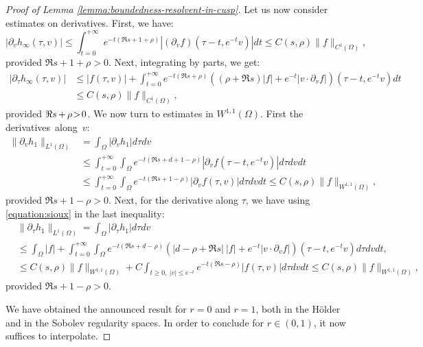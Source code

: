 \documentclass[JEP,XML,SOM,Unicode,NoFloatCountersInSection]{cedram}
\theoremstyle{plain}
\theoremstyle{definition}
\begin{document}
\begin{proof}[Proof of Lemma \ref{lemma:boundedness-resolvent-in-cusp}]
Let us now consider estimates on derivatives. First, we have:
\[
|\partial_v h_\infty(\tau,v)| \leq \int_{t=0}^{+\infty} e^{-t(\Re s + 1 + \rho)} |(\partial_v f)(\tau- t, e^{-t} v)| dt \leq C(s,\rho) \|f\|_{C^1(\Omega)},
\]
provided $\Re s + 1 + \rho>0$. Next, integrating by parts, we get:
\[
\begin{split}
|\partial_\tau h_\infty(\tau,v)| &\leq |f(\tau,v)| + \int_{t=0}^{+\infty} e^{-t(\Re s + \rho)} \left( (\rho+\Re s)|f| + e^{-t} |v\cdot\partial_v f|\right)(\tau- t, e^{-t} v) dt \\
&\leq C(s,\rho) \|f\|_{C^1(\Omega)},
\end{split}
\]
provided $\Re s \mkern-1mu+\mkern-1mu \rho \!>\!0$. We now turn to estimates in $W^{1,1}(\Omega)$. First the derivatives~along~$v$:
\[
\begin{split}
\|\partial_v h_1\|_{L^1(\Omega)} &= \int_{\Omega} |\partial_v h_1| d\tau dv \\
& \leq \int_{t=0}^{+\infty} \int_{\Omega} e^{-t(\Re s+d + 1-\rho)} |\partial_vf(\tau - t, e^{-t} v)| d\tau dv dt \\
&\leq \int_{t= 0}^{+\infty} \int_{\Omega} e^{-t(\Re s + 1-\rho)} |\partial_v f(\tau, v)| d\tau dv dt \leq C(s,\rho) \|f\|_{W^{1,1}(\Omega)},
\end{split}
\]
provided $\Re s + 1 - \rho > 0$. Next, for the derivative along $\tau$, we have using \eqref{equation:sioux} in the last inequality:
\[
\begin{split}
&\|\partial_\tau h_1\|_{L^1(\Omega)} = \int_{\Omega} |\partial_\tau h_1| d\tau dv \\
& \leq \int_{\Omega} |f| + \int_{t=0}^{+\infty}\int_{\Omega} e^{-t(\Re s + d - \rho)} \left( |d - \rho+\Re s|\ |f| + e^{-t} |v\cdot\partial_v f|\right)(\tau- t, e^{-t} v) d\tau dv dt,\\
& \leq C(s,\rho)\|f\|_{W^{1,1}(\Omega)} + C \int_{t\geq 0,\ |v|\leq e^{-t}} e^{-t (\Re s - \rho)} |f(\tau, v)| d\tau dv dt \leq C(s,\rho) \|f\|_{W^{1,1}(\Omega)},
\end{split}
\]
provided $\Re s + 1 -\rho >0$.

We have obtained the announced result for $r=0$ and $r=1$, both in the Hölder and in the Sobolev regularity spaces. In order to conclude for $r \in (0,1)$, it now suffices to interpolate.
\end{proof}
\end{document}
